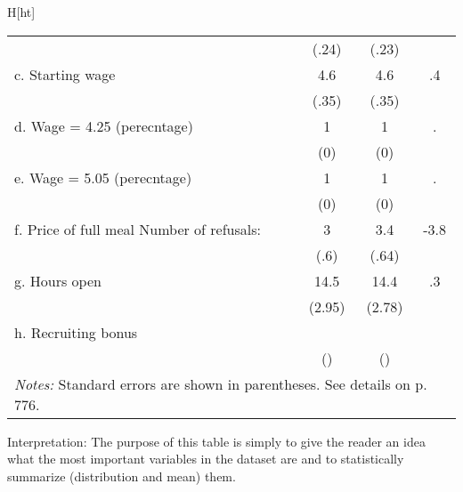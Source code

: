 \documentclass[11pt]{article}
\begin{document}
\begin{center}
{\begin{table}{H}[ht]
\begin{tabular}{@{}lccc@{}}
		& (.24) & (.23) & \\
		c. Starting wage & 4.6 & 4.6 & .4\\
		& (.35) & (.35) & \\
		d. Wage = 4.25 (perecntage) & 1 & 1 & .\\
		& (0) & (0) &\\
		e. Wage = 5.05 (perecntage) & 1 & 1 & .\\
		& (0) & (0) &\\
		f. Price of full meal Number of refusals: & 3 & 3.4 & -3.8\\
		& (.6) & (.64) & \\
		g. Hours open & 14.5 & 14.4 & .3\\
		& (2.95) & (2.78) &\\
		h. Recruiting bonus &  &  & \\
		& () & () &\\
		\bottomrule
		\multicolumn{4}{l}{\footnotesize{\textit{Notes:} Standard errors are shown in parentheses. See details on p. 776.}}
	\end{tabular}
\end{table}

		}
		
\end{center}

\newpage Interpretation: The purpose of this table is simply to give the reader an idea what the most important variables in the dataset are and to statistically summarize (distribution and mean) them.		
\end{document}
